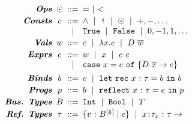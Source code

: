 $$
\arraycolsep=2.5pt
\begin{array}{rccl}
\emphbf{Ops}& \odot
  & ::= & = \spmid  <
\\[0.03in]

\emphbf{Consts}& c
  & ::=
  & \land \spmid \lnot \spmid \odot \spmid +,-,\dots  \\
  && \spmid & \etrue\spmid \efalse \spmid 0, -1, 1, \dots
\\[0.03in]

\emphbf{Vals}& w
  & ::=&  c \spmid \efun{x}{\typ}{e} \spmid D\ \overline{w}
\\[0.03in]

\emphbf{Exprs}& e
  & ::=    & w \spmid x \spmid \eapp{e}{e}      \\
  && \spmid & \ecase{x}{e}{\dc}{\overline{x}}{e}
\\[0.06in]

\emphbf{Binds}& \bd
  & ::= & e \spmid \eletb{x}{\gtyp}{\bd}{\bd}
\\[0.03in]

\emphbf{Progs}& \prog
  & ::= & \bd \spmid \erefb{x}{\gtyp}{e}{\prog}
\\[0.03in]

\emphbf{Bas. Types}& \btyp
  & ::= & \tint \spmid \tbool \spmid T
\\[0.03in]

\emphbf{Ref. Types}& \typ
  & ::=   &  {\tref{v}{\btyp^{[\tlabel]}}{\refa}} \spmid \trfun{x}{\typ_x}{\typ}
\end{array}
$$
